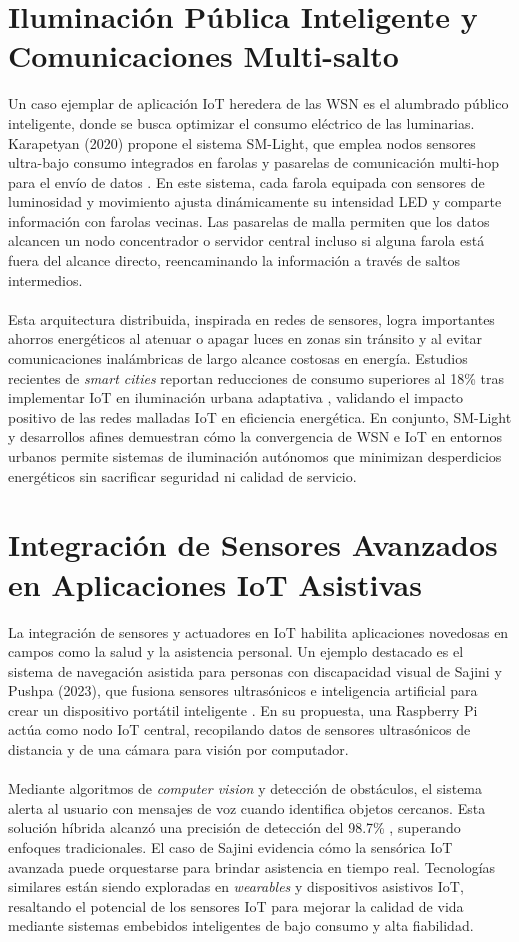 \section{Iluminación Pública Inteligente y Comunicaciones Multi-salto}
Un caso ejemplar de aplicación IoT heredera de las WSN es el alumbrado público inteligente, donde se busca optimizar el consumo eléctrico de las luminarias. Karapetyan (2020) propone el sistema SM-Light, que emplea nodos sensores ultra-bajo consumo integrados en farolas y pasarelas de comunicación multi-hop para el envío de datos \cite{Karapetyan2020}. En este sistema, cada farola equipada con sensores de luminosidad y movimiento ajusta dinámicamente su intensidad LED y comparte información con farolas vecinas. Las pasarelas de malla permiten que los datos alcancen un nodo concentrador o servidor central incluso si alguna farola está fuera del alcance directo, reencaminando la información a través de saltos intermedios.
\\\\
Esta arquitectura distribuida, inspirada en redes de sensores, logra importantes ahorros energéticos al atenuar o apagar luces en zonas sin tránsito y al evitar comunicaciones inalámbricas de largo alcance costosas en energía. Estudios recientes de \textit{smart cities} reportan reducciones de consumo superiores al 18\% tras implementar IoT en iluminación urbana adaptativa \cite{Muthekar2024}, validando el impacto positivo de las redes malladas IoT en eficiencia energética. En conjunto, SM-Light y desarrollos afines demuestran cómo la convergencia de WSN e IoT en entornos urbanos permite sistemas de iluminación autónomos que minimizan desperdicios energéticos sin sacrificar seguridad ni calidad de servicio.

\section{Integración de Sensores Avanzados en Aplicaciones IoT Asistivas}
La integración de sensores y actuadores en IoT habilita aplicaciones novedosas en campos como la salud y la asistencia personal. Un ejemplo destacado es el sistema de navegación asistida para personas con discapacidad visual de Sajini y Pushpa (2023), que fusiona sensores ultrasónicos e inteligencia artificial para crear un dispositivo portátil inteligente \cite{Sajini2023}. En su propuesta, una Raspberry Pi actúa como nodo IoT central, recopilando datos de sensores ultrasónicos de distancia y de una cámara para visión por computador.
\\\\
Mediante algoritmos de \textit{computer vision} y detección de obstáculos, el sistema alerta al usuario con mensajes de voz cuando identifica objetos cercanos. Esta solución híbrida alcanzó una precisión de detección del 98.7\% \cite{Sajini2023}, superando enfoques tradicionales. El caso de Sajini evidencia cómo la sensórica IoT avanzada puede orquestarse para brindar asistencia en tiempo real. Tecnologías similares están siendo exploradas en \textit{wearables} y dispositivos asistivos IoT, resaltando el potencial de los sensores IoT para mejorar la calidad de vida mediante sistemas embebidos inteligentes de bajo consumo y alta fiabilidad.

